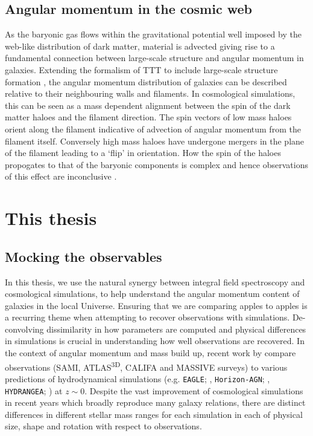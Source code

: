 \subsection{Angular momentum in the cosmic web}
As the baryonic gas flows within the gravitational potential well imposed by the web-like distribution of dark matter, material is advected giving rise to a fundamental connection between large-scale structure and angular momentum in galaxies. Extending the formalism of TTT to include large-scale structure formation \citep[e.g.][]{pichon2011, codis2015, laigle2015}, the angular momentum distribution of galaxies can be described relative to their neighbouring walls and filaments. In cosmological simulations, this can be seen as a mass dependent alignment between the spin of the dark matter haloes and the filament direction. The spin vectors of low mass haloes orient along the filament indicative of advection of angular momentum from the filament itself. Conversely high mass haloes have undergone mergers in the plane of the filament leading to a `flip' in orientation. How the spin of the haloes propogates to that of the baryonic components is complex and hence observations of this effect are inconclusive \citep[e.g.][]{tempel2013a, krolewski2019, welker2020}. 

\section{This thesis}
\subsection{Mocking the observables}
In this thesis, we use the natural synergy between integral field spectroscopy and cosmological simulations, to help understand the angular momentum content of galaxies in the local Universe. Ensuring that we are comparing apples to apples is a recurring theme when attempting to recover observations with simulations. De-convolving dissimilarity in how parameters are computed and physical differences in simulations is crucial in understanding how well observations are recovered. In the context of angular momentum and mass build up, recent work by \citet{sande2019} compare observations (SAMI, ATLAS\textsuperscript{3D}, CALIFA and MASSIVE surveys) to various predictions of hydrodynamical simulations (e.g. \texttt{EAGLE}; \citet{schaye2015}, \texttt{Horizon-AGN}; \citet{dubois2014}, \texttt{HYDRANGEA}; \citet{bahe2017}) at $z \sim 0$. Despite the vast improvement of cosmological simulations in recent years which broadly reproduce many galaxy relations, there are distinct differences in different stellar mass ranges for each simulation in each of physical size, shape and rotation with respect to observations.

